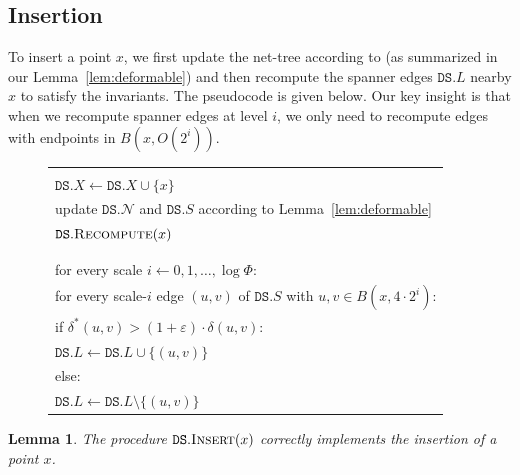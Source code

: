 \documentclass[11pt]{article}
\makeatletter
\let\e\varepsilon               %
\def\set#1{\{ #1 \}}
\def\begin@lgo{\begin{minipage}{1in}\small\begin{tabbing}
        \quad\=\qquad\=\qquad\=\qquad\=\qquad\=\qquad\=\qquad\=\qquad\=\qquad\=\qquad\=\qquad\=\qquad\=\qquad\=\kill}
\def\end@lgo{\end{tabbing}\end{minipage}}
\newenvironment{algorithm}
{\begin{tabular}{|l|}\hline\begin@lgo}
{\end@lgo\\\hline\end{tabular}}
\newcommand \myul[4]{%
  \begingroup%
  \renewcommand \ULdepth {#1}%
  \renewcommand \ULthickness {#2}%
  \contourlength{#3}%
  \uline{\phantom{#4}}\llap{\contour{white}{#4}}%
  \endgroup%
}
\def\ul#1{\myul{2pt}{0.6pt}{1pt}{#1}}
\newtheorem{lemma}[theorem]{Lemma}
\newcommand{\cN}{\mathcal{N}}
\newcommand{\dist}{\ensuremath{\delta}}
\newcommand{\DS}{\texttt{DS}}
\newcommand{\points}{{\ensuremath{\DS.X}}}
\newcommand{\sparse}{{\ensuremath{\DS.S}}}
\newcommand{\net}{{\ensuremath{\DS.\cN}}}
\newcommand{\light}{{\ensuremath{\DS.L}}}
\makeatother
\begin{document}
\subsection{Insertion}
To insert a point $x$, we first update the net-tree according to \cite{gao2004deformable} (as summarized in our Lemma~\ref{lem:deformable})
and then recompute the spanner edges $\light$ nearby $x$ to satisfy the invariants. The pseudocode is given below. Our key insight is that when we recompute spanner edges at level $i$, we only need to recompute edges with endpoints in $B(x, O(2^i))$.
%
\begin{figure}[h!]
\centering
\begin{algorithm}
    \ul{$\texttt{DS}.\textsc{Insert}(x)$}:\+
    \\ $\points \gets \points \cup \set{x}$
    \\ update $\net$ and $\sparse$ according to Lemma~\ref{lem:deformable}
    \\ $\texttt{DS}.\textsc{Recompute}(x)$\-
    \\    
    \\ \ul{$\texttt{DS}.\textsc{Recompute}(x)$:}\+
    \\ for every scale $i \gets 0, 1, \ldots, \log \Phi$:\+
    \\      for every scale-$i$ edge $(u,v)$ of $\sparse$ with $u,v \in B(x, 4 \cdot 2^i)$:\+
    \\          if $\dist^*(u,v) > (1+\e) \cdot \dist(u,v)$:\+
    \\  $\light \gets \light \cup \set{(u,v)}$\-
    \\ else:\+
    \\ $\light \gets \light \setminus \set{(u,v)}$\-
\end{algorithm}
\label{fig:insert-recourse}
\end{figure}
%
\begin{lemma}
\label{lem:insert-invariants}
The procedure $\DS.\textsc{Insert}(x)$ correctly implements the insertion of a point $x$.
\end{lemma}
\end{document}
